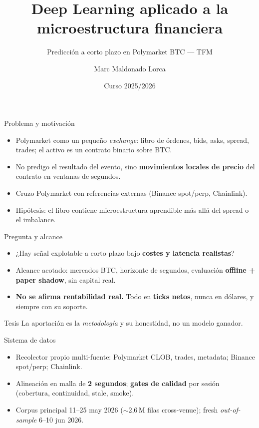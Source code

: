 \documentclass[aspectratio=169,11pt]{beamer}
\title[Microestructura Polymarket BTC]{Deep Learning aplicado a la microestructura financiera}
\subtitle{Predicción a corto plazo en Polymarket BTC --- TFM}
\author{Marc Maldonado Lorca}
\institute{UPM --- Máster en Deep Learning}
\date{Curso 2025/2026}
\begin{document}
\begin{frame}[plain]
  \titlepage
\end{frame}

\begin{frame}{Problema y motivación}
  \begin{itemize}
    \item Polymarket como un pequeño \emph{exchange}: libro de órdenes, bids, asks,
      spread, trades; el activo es un contrato binario sobre BTC.
    \item No predigo el resultado del evento, sino \textbf{movimientos locales de
      precio} del contrato en ventanas de segundos.
    \item Cruzo Polymarket con referencias externas (Binance spot/perp, Chainlink).
    \item Hipótesis: el libro contiene microestructura aprendible más allá del
      spread o el imbalance.
  \end{itemize}
\end{frame}

\begin{frame}{Pregunta y alcance}
  \begin{itemize}
    \item ¿Hay señal explotable a corto plazo bajo \textbf{costes y latencia
      realistas}?
    \item Alcance acotado: mercados BTC, horizonte de segundos, evaluación
      \textbf{offline + paper shadow}, sin capital real.
    \item \textbf{No se afirma rentabilidad real.} Todo en \textbf{ticks netos},
      nunca en dólares, y siempre con su soporte.
  \end{itemize}
  \begin{block}{Tesis}
    La aportación es la \emph{metodología} y su honestidad, no un modelo ganador.
  \end{block}
\end{frame}

\begin{frame}{Sistema de datos}
  \begin{itemize}
    \item Recolector propio multi-fuente: Polymarket CLOB, trades, metadata;
      Binance spot/perp; Chainlink.
    \item Alineación en malla de \textbf{2 segundos}; \textbf{gates de calidad}
      por sesión (cobertura, continuidad, stale, smoke).
    \item Corpus principal 11--25 may 2026 ($\sim$2,6\,M filas cross-venue);
      fresh \emph{out-of-sample} 6--10 jun 2026.
  \end{itemize}
\end{frame}
\end{document}
